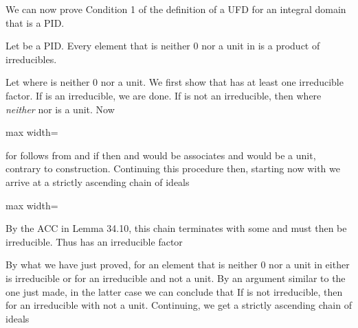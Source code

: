 \documentclass[11pt,oneside]{article}
\begin{document}
\begin{BookBody}

We can now prove Condition 1 of the definition of a UFD for an integral domain that is a PID.

 Let  be a PID. Every element that is neither 0 nor a unit in  is a product of irreducibles.

 Let  where  is neither 0 nor a unit. We first show that  has at least one irreducible factor. If  is an irreducible, we are done. If  is not an irreducible, then  where \textit{neither}  nor  is a unit. Now

\begin{center}\begin{adjustbox}{max width=\linewidth}\end{adjustbox}\end{center}

\noindent for  follows from  and if  then  and  would be associates and  would be a unit, contrary to construction. Continuing this procedure then, starting now with  we arrive at a strictly ascending chain of ideals

\begin{center}\begin{adjustbox}{max width=\linewidth}\end{adjustbox}\end{center}

\noindent By the ACC in Lemma 34.10, this chain terminates with some  and  must then be irreducible. Thus  has an irreducible factor 

By what we have just proved, for an element  that is neither 0 nor a unit in  either  is irreducible or  for  an irreducible and  not a unit. By an argument similar to the one just made, in the latter case we can conclude that  If  is not irreducible, then  for an irreducible  with  not a unit. Continuing, we get a strictly ascending chain of ideals


\end{BookBody}
\end{document}
